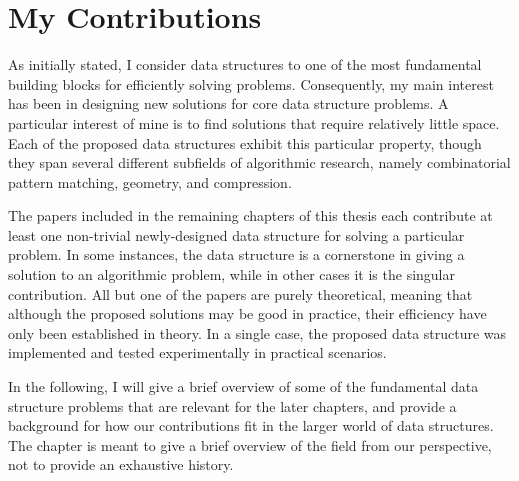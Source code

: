 \section{My Contributions}
As initially stated, I consider data structures to one of the most fundamental building blocks for efficiently solving problems. 
Consequently, my main interest has been in designing new solutions for core data structure problems.
A particular interest of mine is to find solutions that require relatively little space. Each of the proposed data structures exhibit this particular property, though they span several different subfields of algorithmic research, namely combinatorial pattern matching, geometry, and compression. 

The papers included in the remaining chapters of this thesis each contribute at least one non-trivial newly-designed data structure for solving a particular problem. In some instances, the data structure is a cornerstone in giving a solution to an algorithmic problem, while in other cases it is the singular contribution. All but one of the papers are purely theoretical, meaning that although the proposed solutions may be good in practice, their efficiency have only been established in theory. In a single case, the proposed data structure was implemented and tested experimentally in practical scenarios.

In the following, I will give a brief overview of some of the fundamental data structure problems that are relevant for the later chapters, and provide a background for how our contributions fit in the larger world of data structures. The chapter is meant to give a brief overview of the field from our perspective, not to provide an exhaustive history.

